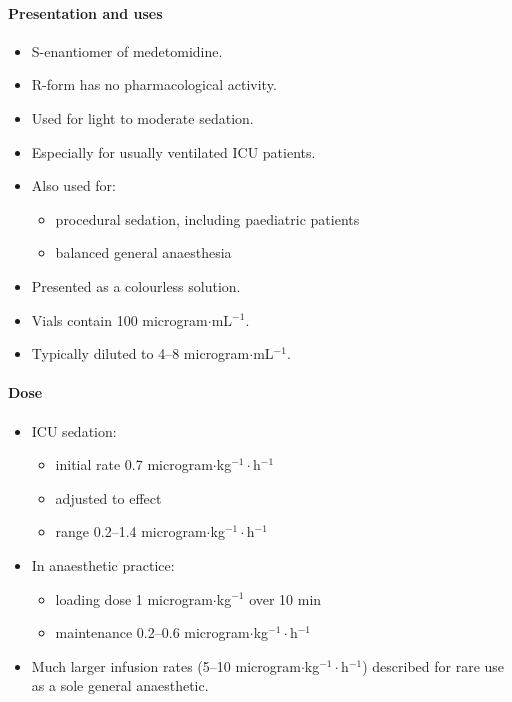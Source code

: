 \documentclass[11pt,a4paper]{article}
\begin{document}
\paragraph{Presentation and uses}
\begin{itemize}
  \item S-enantiomer of medetomidine.
  \item R-form has no pharmacological activity.
  \item Used for light to moderate sedation.
  \item Especially for usually ventilated ICU patients.
  \item Also used for:
  \begin{itemize}
    \item procedural sedation, including paediatric patients
    \item balanced general anaesthesia
  \end{itemize}
  \item Presented as a colourless solution.
  \item Vials contain 100 microgram$\cdot$mL$^{-1}$.
  \item Typically diluted to 4--8 microgram$\cdot$mL$^{-1}$.
\end{itemize}

\paragraph{Dose}
\begin{itemize}
  \item ICU sedation:
  \begin{itemize}
    \item initial rate 0.7 microgram$\cdot$kg$^{-1}\cdot$h$^{-1}$
    \item adjusted to effect
    \item range 0.2--1.4 microgram$\cdot$kg$^{-1}\cdot$h$^{-1}$
  \end{itemize}
  \item In anaesthetic practice:
  \begin{itemize}
    \item loading dose 1 microgram$\cdot$kg$^{-1}$ over 10 min
    \item maintenance 0.2--0.6 microgram$\cdot$kg$^{-1}\cdot$h$^{-1}$
  \end{itemize}
  \item Much larger infusion rates (5--10 microgram$\cdot$kg$^{-1}\cdot$h$^{-1}$) described for rare use as a sole general anaesthetic.
\end{itemize}
\end{document}
